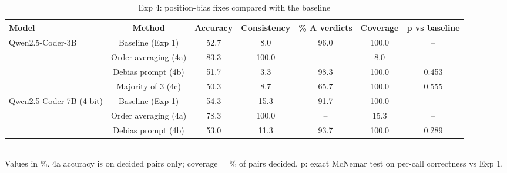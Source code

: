 \begin{table}[t]
\centering
\caption{Exp 4: position-bias fixes compared with the baseline}
\label{tab:t3_fixes}
\footnotesize
\setlength{\tabcolsep}{3pt}
\begin{tabular}{lcccccc}
\hline
Model & Method & Accuracy & Consistency & \% A verdicts & Coverage & p vs baseline \\
\hline
Qwen2.5-Coder-3B & Baseline (Exp 1) & 52.7 & 8.0 & 96.0 & 100.0 & -- \\
 & Order averaging (4a) & 83.3 & 100.0 & -- & 8.0 & -- \\
 & Debias prompt (4b) & 51.7 & 3.3 & 98.3 & 100.0 & 0.453 \\
 & Majority of 3 (4c) & 50.3 & 8.7 & 65.7 & 100.0 & 0.555 \\
Qwen2.5-Coder-7B (4-bit) & Baseline (Exp 1) & 54.3 & 15.3 & 91.7 & 100.0 & -- \\
 & Order averaging (4a) & 78.3 & 100.0 & -- & 15.3 & -- \\
 & Debias prompt (4b) & 53.0 & 11.3 & 93.7 & 100.0 & 0.289 \\
\hline
\end{tabular}
\\[2pt]
{\scriptsize Values in \%. 4a accuracy is on decided pairs only; coverage = \% of pairs decided. p: exact McNemar test on per-call correctness vs Exp 1.}
\end{table}
